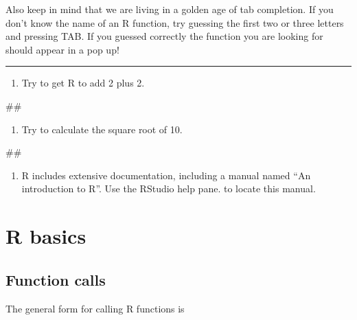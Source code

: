 \documentclass[]{book}
\newenvironment{Shaded}{\begin{snugshade}}{\end{snugshade}}
\newcommand{\NormalTok}[1]{#1}
\providecommand{\tightlist}{%
  \setlength{\itemsep}{0pt}\setlength{\parskip}{0pt}}
\begin{document}
Also keep in mind that we are living in a golden age of tab completion.
If you don't know the name of an R function, try guessing the first two
or three letters and pressing TAB. If you guessed correctly the function
you are looking for should appear in a pop up!

\begin{center}\rule{0.5\linewidth}{\linethickness}\end{center}

\begin{enumerate}
\def\labelenumi{\arabic{enumi}.}
\tightlist
\item
  Try to get R to add 2 plus 2.
\end{enumerate}

\begin{Shaded}
\begin{Highlighting}[]
\NormalTok{##}
\end{Highlighting}
\end{Shaded}

\begin{enumerate}
\def\labelenumi{\arabic{enumi}.}
\setcounter{enumi}{1}
\tightlist
\item
  Try to calculate the square root of 10.
\end{enumerate}

\begin{Shaded}
\begin{Highlighting}[]
\NormalTok{##}
\end{Highlighting}
\end{Shaded}

\begin{enumerate}
\def\labelenumi{\arabic{enumi}.}
\setcounter{enumi}{2}
\tightlist
\item
  R includes extensive documentation, including a manual named ``An
  introduction to R''. Use the RStudio help pane. to locate this manual.
\end{enumerate}

\section{R basics}\label{r-basics}

\subsection{Function calls}\label{function-calls}

The general form for calling R functions is
\end{document}
